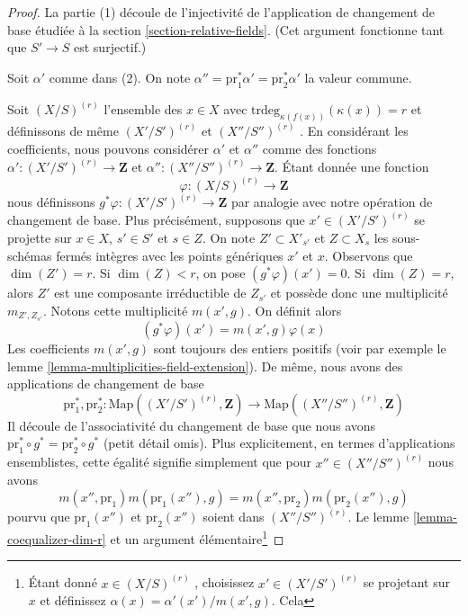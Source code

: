 \begin{proof} 
La partie (1) découle de l'injectivité de l'application de changement de base étudiée à
 la section  \ref{section-relative-fields}. (Cet argument fonctionne 
tant que $S' \to S$  est surjectif.) 

\medskip\noindent
 Soit  $\alpha'$  comme dans (2). On note  
$\alpha'' = \text{pr}_1^*\alpha' = \text{pr}_2^*\alpha'$
  la valeur commune. 

\medskip\noindent
 Soit  $(X/S)^{(r)}$  l'ensemble des  $x \in X$  avec  
$\text{trdeg}_{\kappa(f(x))}(\kappa(x)) = r$
  et définissons de même  $(X'/S')^{(r)}$  et  $(X''/S'')^{(r)}$
 . En considérant les coefficients, nous pouvons considérer  $\alpha'$  et  $\alpha''$  comme des fonctions  
$\alpha' : (X'/S')^{(r)} \to \mathbf{Z}$ et  
$\alpha'' : (X''/S'')^{(r)} \to \mathbf{Z}$. 
Étant donnée une fonction 
$$
\varphi : (X/S)^{(r)} \to \mathbf{Z}
$$
 nous définissons  $g^*\varphi : (X'/S')^{(r)} \to \mathbf{Z}$  par analogie avec
 notre opération de changement de base. Plus précisément, supposons que  $x' \in (X'/S')^{(r)}$
  se projette sur $x \in X$,  $s' \in S'$ et $s \in Z$.
 On note  $Z' \subset X'_{s'}$  et  $Z \subset X_s$  les sous-schémas
 fermés intègres avec les points génériques  $x'$  et  $x$. Observons
 que $\dim(Z') = r$. Si  $\dim(Z) < r$, on pose  $(g^*\varphi)(x') = 0$. 
Si  $\dim(Z) = r$, alors  $Z'$  est une composante irréductible de  $Z_{s'}$  et 
possède donc une multiplicité  $m_{Z', Z_{s'}}$. Notons cette multiplicité $m(x', g)$.
 On définit alors 
$$
(g^*\varphi)(x') = m(x', g) \varphi(x)
$$
 Les coefficients  $m(x', g)$  sont toujours des entiers positifs
 (voir par exemple le lemme  \ref{lemma-multiplicities-field-extension}). De même, nous
 avons des applications de changement de base 
$$
\text{pr}_1^*, \text{pr}_2^* :
\text{Map}((X'/S')^{(r)}, \mathbf{Z})
\longrightarrow
\text{Map}((X''/S'')^{(r)}, \mathbf{Z})
$$
 Il découle de l'associativité du changement de base que nous avons  
$\text{pr}_1^* \circ g^* = \text{pr}_2^* \circ g^*$ (petit détail 
omis). Plus explicitement, en termes d'applications ensemblistes, cette 
égalité signifie simplement que pour  $x'' \in (X''/S'')^{(r)}$  nous avons 
$$
m(x'', \text{pr}_1) m(\text{pr}_1(x''), g) =
m(x'', \text{pr}_2) m(\text{pr}_2(x''), g)
$$
 pourvu que  $\text{pr}_1(x'')$  et  $\text{pr}_2(x'')$  soient 
dans  $(X''/S'')^{(r)}$.
 Le lemme \ref{lemma-coequalizer-dim-r}  et un argument 
élémentaire\footnote{Étant donné $x \in (X/S)^{(r)}$ , choisissez $x' \in (X'/S')^{(r)}$
 se projetant sur  $x$  et définissez $\alpha(x) = \alpha'(x')/m(x', g)$. Cela 
}
\end{proof}
